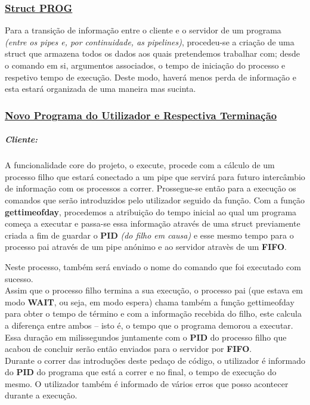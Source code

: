 \documentclass{report}
\begin{document}
\subsubsection{\underline{Struct \textbf{PROG}}}

Para a transição de informação entre o cliente e o servidor de um programa \textit{(entre os pipes e, por continuidade, as pipelines)}, procedeu-se a criação de uma struct que armazena todos os dados aos quais pretendemos trabalhar com; desde o comando em si, argumentos associados, o tempo de iniciação do processo e respetivo tempo de execução. Deste modo, haverá menos perda de informação e esta estará organizada de uma maneira mas sucinta.

\subsubsection{\underline{Novo Programa do Utilizador e Respectiva Terminação}}

\subparagraph{Cliente:}
A funcionalidade core do projeto, o execute, procede com a cálculo de um processo filho que estará conectado a um pipe que servirá para futuro intercâmbio de informação com os processos a correr. Prossegue-se então para a execução os comandos que serão introduzidos pelo utilizador seguido da função.
Com a função \textbf{gettimeofday}, procedemos a atribuição do tempo inicial ao qual um programa começa a executar e passa-se essa informação através de uma struct previamente criada a fim de guardar o \textbf{PID} \textit{(do filho em causa)} e esse mesmo tempo para o processo pai através de um pipe anónimo e ao servidor atravès de um \textbf{FIFO}.\par
Neste processo, também será enviado o nome do comando que foi executado com sucesso.\\

Assim que o processo filho termina a sua execução, o processo pai (que estava em modo \textbf{WAIT}, ou seja, em modo espera) chama também a função gettimeofday para obter o tempo de término e com a informação recebida do filho, este calcula a diferença entre ambos – isto é, o tempo que o programa demorou a executar. Essa duração em milissegundos juntamente com o \textbf{PID} do processo filho que acabou de concluir serão então enviados para o servidor por \textbf{FIFO}.\\

Durante o correr das introduções deste pedaço de código, o utilizador é informado do \textbf{PID} do programa que está a correr e no final, o tempo de execução do mesmo. O utilizador também é informado de vários erros que posso acontecer durante a execução.
\end{document}
